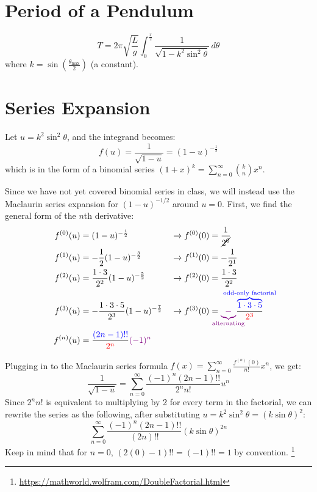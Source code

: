 \documentclass[12pt]{article}
\begin{document}
\section{Period of a Pendulum}
\[
  T = 2\pi \sqrt{\frac{L}{g}} \int_{0}^{\frac{\pi}{2}} \frac{1}{\sqrt{1 - k^2
  \sin^2 \theta}} \, d\theta
\]
where $k = \sin\left(\frac{\theta_{\mathrm{max}}}{2}\right)$ (a constant).

\section{Series Expansion}
Let $u = k^2 \sin^2 \theta$, and the integrand becomes:
\[
  f(u) = \frac{1}{\sqrt{1 - u}} = (1 - u)^{-\frac{1}{2}}
\]
which is in the form of a binomial series $(1+x)^k =
\sum_{n=0}^{\infty} \binom{k}{n} x^n$.

Since we have not yet covered binomial series in class, we will instead
use the Maclaurin series expansion for $(1 - u)^{-1/2}$ around $u =
0$. First, we find the general form of the $n$th derivative:
\begin{align*}
  f^{(0)}(u) &= (1-u)^{-\frac{1}{2}} &&\rightarrow f^{(0)}(0) =
  \frac{1}{\cancel{2^0}} \\
  f^{(1)}(u) &= -\frac{1}{2} (1-u)^{-\frac{3}{2}} &&\rightarrow
  f^{(1)}(0) = -\frac{1}{2^1} \\
  f^{(2)}(u) &= \frac{1\cdot3}{2^2} (1-u)^{-\frac{5}{2}}
  &&\rightarrow f^{(2)}(0) = \frac{1\cdot3}{2^2} \\
  f^{(3)}(u) &= -\frac{1\cdot3\cdot5}{2^3} (1-u)^{-\frac{7}{2}}
  &&\rightarrow f^{(3)}(0) =
  {\color{violet}\underbrace{-}_{\mathclap{\text{alternating}}}}
  \frac{\color{blue}\overbrace{1\cdot3\cdot5}^{\mathclap{\text{odd-only
  factorial}}}}{\color{red}2^3} \\
  f^{(n)}(u) &= \frac{{\color{blue}(2n-1)!!}}{{\color{red}2^n}}
  {\color{violet}(-1)^n}
\end{align*}

Plugging in to the Maclaurin series formula $f(x) =
\sum_{n=0}^{\infty} \frac{f^{(n)}(0)}{n!} x^n$, we get:
\[
  \frac{1}{\sqrt{1 - u}} = \sum_{n=0}^{\infty} \frac{(-1)^n
  (2n-1)!!}{2^n n!} u^n
\]
Since $2^n n!$ is equivalent to multiplying by 2 for every term in
the factorial, we can rewrite the series as the following, after
substituting $u = k^2 \sin^2 \theta = (k\sin\theta)^2$:
\[
  \sum_{n=0}^{\infty} \frac{(-1)^n (2n-1)!!}{(2n)!!}
  {\left(k\sin\theta\right)}^{2n}
\]
Keep in mind that for $n = 0$, $(2(0) - 1)!! = (-1)!! = 1$ by
convention. \footnote{\url{https://mathworld.wolfram.com/DoubleFactorial.html}}
\end{document}
